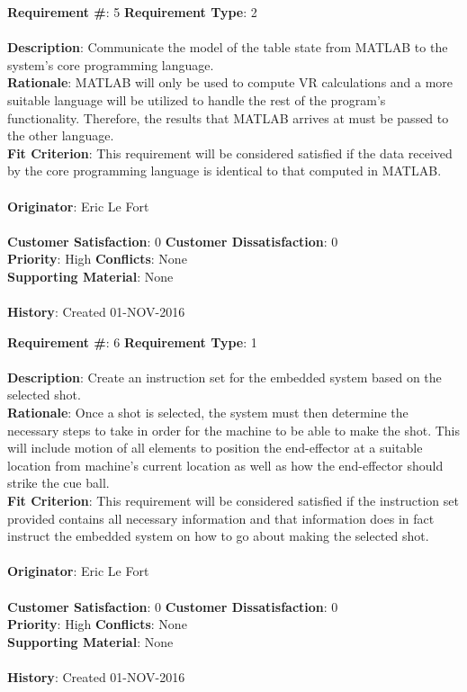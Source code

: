 \documentclass[titlepage]{article}
\begin{document}
\begin{framed}
	\noindent\textbf{Requirement \#}: 5 \hfill \textbf{Requirement Type}: 2 \hfill\\\\
	\noindent\textbf{Description}: Communicate the model of the table state from MATLAB to the system's core programming language.\\
	\textbf{Rationale}: MATLAB will only be used to compute VR calculations and a more suitable language will be utilized to handle the rest of the program's functionality. Therefore, the results that MATLAB arrives at must be passed to the other language.\\
	\textbf{Fit Criterion}: This requirement will be considered satisfied if the data received by the core programming language is identical to that computed in MATLAB.\\\\
	\textbf{Originator}: Eric Le Fort\\\\
	\noindent\textbf{Customer Satisfaction}: 0 \hfill 	\textbf{Customer Dissatisfaction}: 0 \hfill\\
	\textbf{Priority}: High \hfill \textbf{Conflicts}: None \hfill\\
	\textbf{Supporting Material}: None\\\\
	\noindent\textbf{History}: Created 01-NOV-2016
\end{framed}

\begin{framed}
	\noindent\textbf{Requirement \#}: 6 \hfill \textbf{Requirement Type}: 1 \hfill\\\\
	\noindent\textbf{Description}: Create an instruction set for the embedded system based on the selected shot.\\
	\textbf{Rationale}: Once a shot is selected, the system must then determine the necessary steps to take in order for the machine to be able to make the shot. This will include motion of all elements to position the end-effector at a suitable location from machine's current location as well as how the end-effector should strike the cue ball.\\
	\textbf{Fit Criterion}: This requirement will be considered satisfied if the instruction set provided contains all necessary information and that information does in fact instruct the embedded system on how to go about making the selected shot.\\\\
	\textbf{Originator}: Eric Le Fort\\\\
	\noindent\textbf{Customer Satisfaction}: 0 \hfill 	\textbf{Customer Dissatisfaction}: 0 \hfill\\
	\textbf{Priority}: High \hfill \textbf{Conflicts}: None \hfill\\
	\textbf{Supporting Material}: None\\\\
	\noindent\textbf{History}: Created 01-NOV-2016
\end{framed}
\end{document}
